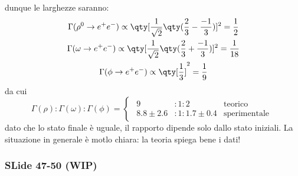 \begin{itemize}
dunque le larghezze saranno:
\begin{gather*}
\Gamma(\rho^0\to e^+e^-)\propto \qty[\frac1{\sqrt2}\qty(\frac23-\frac{-1}3)]^2=\frac12\\
\Gamma(\omega\to e^+e^-)\propto \qty[\frac1{\sqrt2}\qty(\frac23+\frac{-1}3)]^2=\frac1{18}\\
\Gamma(\phi\to e^+e^-)\propto \qty[\frac13]^2=\frac19
\end{gather*}
da cui 
\begin{equation*}
\Gamma(\rho):\Gamma(\omega):\Gamma(\phi)=
\begin{cases}
    \begin{aligned}
        9&:1:2 &\text{teorico}\\
        8.8\pm2.6&:1:1.7\pm0.4 &\text{sperimentale}
    \end{aligned}
\end{cases}
\end{equation*}
dato che lo stato finale è uguale, il rapporto dipende solo dallo stato iniziali. La situazione in generale è motlo chiara: la teoria spiega bene i dati!
\end{itemize}
\subsubsection{SLide 47-50 (WIP)}
